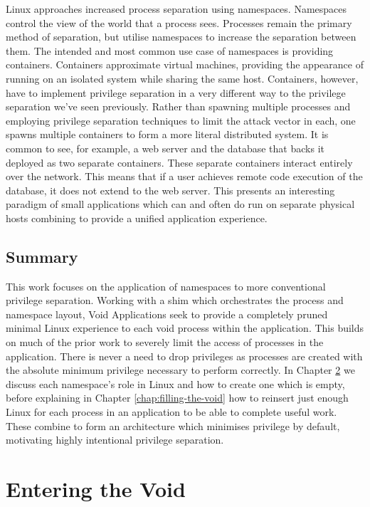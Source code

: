 \documentclass[12pt,a4paper,twoside]{report}
\begin{document}
Linux approaches increased process separation using namespaces. Namespaces control the view of the world that a process sees. Processes remain the primary method of separation, but utilise namespaces to increase the separation between them. The intended and most common use case of namespaces is providing containers. Containers approximate virtual machines, providing the appearance of running on an isolated system while sharing the same host. Containers, however, have to implement privilege separation in a very different way to the privilege separation we've seen previously. Rather than spawning multiple processes and employing privilege separation techniques to limit the attack vector in each, one spawns multiple containers to form a more literal distributed system. It is common to see, for example, a web server and the database that backs it deployed as two separate containers. These separate containers interact entirely over the network. This means that if a user achieves remote code execution of the database, it does not extend to the web server. This presents an interesting paradigm of small applications which can and often do run on separate physical hosts combining to provide a unified application experience.

\section{Summary}

This work focuses on the application of namespaces to more conventional privilege separation. Working with a shim which orchestrates the process and namespace layout, Void Applications seek to provide a completely pruned minimal Linux experience to each void process within the application. This builds on much of the prior work to severely limit the access of processes in the application. There is never a need to drop privileges as processes are created with the absolute minimum privilege necessary to perform correctly. In Chapter \ref{chap:entering-the-void} we discuss each namespace's role in Linux and how to create one which is empty, before explaining in Chapter \ref{chap:filling-the-void} how to reinsert just enough Linux for each process in an application to be able to complete useful work. These combine to form an architecture which minimises privilege by default, motivating highly intentional privilege separation.


\chapter{Entering the Void}
\label{chap:entering-the-void}
\end{document}
